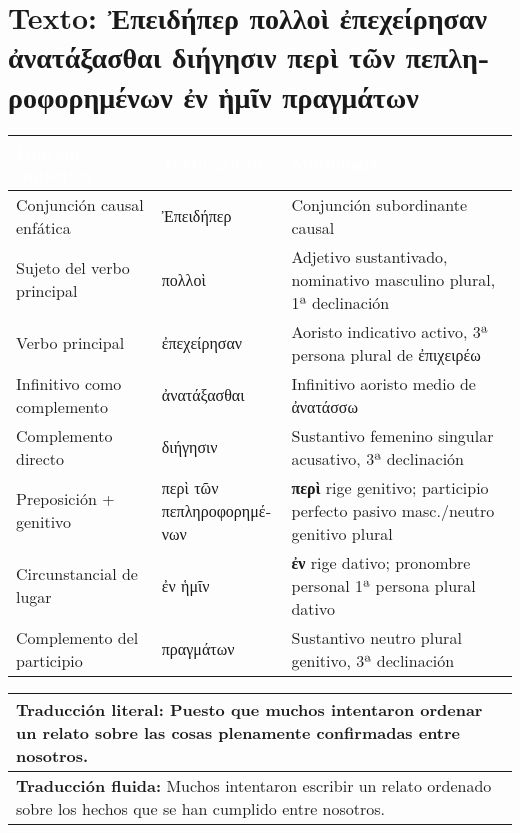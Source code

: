 \documentclass[a4paper,12pt]{article}
\begin{document}
	
	
	
\tableofcontents
\newpage

	
\section{Texto: \textgreek{Ἐπειδήπερ πολλοὶ ἐπεχείρησαν ἀνατάξασθαι διήγησιν περὶ τῶν πεπληροφορημένων ἐν ἡμῖν πραγμάτων}}

\begin{tabularx}{\textwidth}{|Y|Y|Y|}
\textcolor{white}{\textbf{Función sintáctica}} & \textcolor{white}{\textbf{Texto griego}} & \textcolor{white}{\textbf{Morfología}} \\
\hline
Conjunción causal enfática & \textgreek{Ἐπειδήπερ} & Conjunción subordinante causal \\
\hline
Sujeto del verbo principal & \textgreek{πολλοὶ} & Adjetivo sustantivado, nominativo masculino plural, 1ª declinación \\
\hline
Verbo principal & \textgreek{ἐπεχείρησαν} & Aoristo indicativo activo, 3ª persona plural de \textgreek{ἐπιχειρέω} \\
\hline
Infinitivo como complemento & \textgreek{ἀνατάξασθαι} & Infinitivo aoristo medio de \textgreek{ἀνατάσσω} \\
\hline
Complemento directo & \textgreek{διήγησιν} & Sustantivo femenino singular acusativo, 3ª declinación \\
\hline
Preposición + genitivo & \textgreek{περὶ τῶν πεπληροφορημένων} & \textbf{περὶ} rige genitivo; participio perfecto pasivo masc./neutro genitivo plural \\
\hline
Circunstancial de lugar & \textgreek{ἐν ἡμῖν} & \textbf{ἐν} rige dativo; pronombre personal 1ª persona plural dativo \\
\hline
Complemento del participio & \textgreek{πραγμάτων} & Sustantivo neutro plural genitivo, 3ª declinación \\
\hline
\end{tabularx}

\vspace{0.5cm}
\begin{tabularx}{\textwidth}{|Y|}
\hline
\textbf{Traducción literal:} Puesto que muchos intentaron ordenar un relato sobre las cosas plenamente confirmadas entre nosotros. \\
\hline
\textbf{Traducción fluida:} Muchos intentaron escribir un relato ordenado sobre los hechos que se han cumplido entre nosotros. \\
\hline
\end{tabularx}
\end{document}
